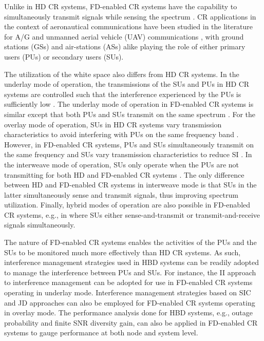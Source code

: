 Unlike in HD CR systems, FD-enabled CR systems have the capability to simultaneously transmit signals while sensing the spectrum \cite{amjad2017full}. CR applications in the context of aeronautical communications have been studied in the literature for A/G \cite{wang2010cognitive,zhang2015aeronautical} and unmanned aerial vehicle (UAV) communications \cite{saleem2015integration,chen2011collaborative}, with ground stations (GSs) and air-stations (ASs) alike playing the role of either primary users (PUs) or secondary users (SUs).

The utilization of the white space also differs from HD CR systems. In the underlay mode of operation, the transmissions of the SUs and PUs in HD CR systems are controlled such that the interference experienced by the PUs is sufficiently low \cite{amjad2017full}. The underlay mode of operation in FD-enabled CR systems is similar except that both PUs and SUs transmit on the same spectrum \cite{amjad2017full,gaafar2017underlay}. For the overlay mode of operation, SUs in HD CR systems vary transmission characteristics to avoid interfering with PUs on the same frequency band \cite{amjad2017full}. However, in FD-enabled CR systems, PUs and SUs simultaneously transmit on the same frequency and SUs vary transmission characteristics to reduce SI \cite{amjad2017full,amin2017overlay}. In the interweave mode of operation, SUs only operate when the PUs are not transmitting for both HD and FD-enabled CR systems \cite{amjad2017full,liao2014listen}. The only difference between HD and FD-enabled CR systems in interweave mode is that SUs in the latter simultaneously sense and transmit signals, thus improving spectrum utilization. Finally, hybrid modes of operation are also possible in FD-enabled CR systems, e.g., in \cite{afifi2015incorporating} where SUs either sense-and-transmit or transmit-and-receive signals simultaneously.

The nature of FD-enabled CR systems enables the activities of the PUs and the SUs to be monitored much more effectively than HD CR systems. As such, interference management strategies used in HBD systems can be readily adopted to manage the interference between PUs and SUs. For instance, the II approach to interference management can be adopted for use in FD-enabled CR systems operating in underlay mode. Interference management strategies based on SIC and JD approaches can also be employed for FD-enabled CR systems operating in overlay mode. The performance analysis done for HBD systems, e.g., outage probability and finite SNR diversity gain, can also be applied in FD-enabled CR systems to gauge performance at both node and system level.

